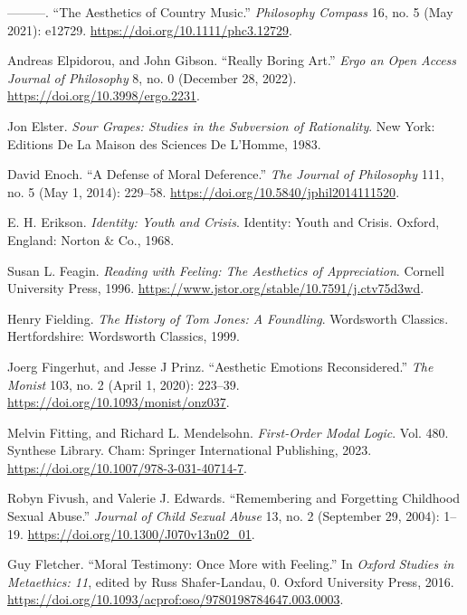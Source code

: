 \documentclass[phdthesis,12pt,final,a4paper]{wuthesis}
\newlength{\cslhangindent}
\newenvironment{CSLReferences}[2] %
{\begin{list}{}{%
	\setlength{\itemindent}{0pt}
	\setlength{\leftmargin}{0pt}
	\setlength{\parsep}{0pt}
	\ifodd #1
	\setlength{\leftmargin}{\cslhangindent}
	\setlength{\itemindent}{-1\cslhangindent}
	\fi
	\setlength{\itemsep}{#2\baselineskip}}}
{\end{list}}
\theoremstyle{definition}
\theoremstyle{definition}
\theoremstyle{definition}
\theoremstyle{definition}
\theoremstyle{remark}
\begin{document}
\begin{CSLReferences}{1}{0}
---------. {``The Aesthetics of Country Music.''} \emph{Philosophy Compass} 16, no. 5 (May 2021): e12729. \url{https://doi.org/10.1111/phc3.12729}.

Andreas Elpidorou, and John Gibson. {``Really {Boring Art}.''} \emph{Ergo an Open Access Journal of Philosophy} 8, no. 0 (December 28, 2022). \url{https://doi.org/10.3998/ergo.2231}.

Jon Elster. \emph{Sour {Grapes}: {Studies} in the {Subversion} of {Rationality}}. New York: Editions De La Maison des Sciences De L'Homme, 1983.

David Enoch. {``A {Defense} of {Moral Deference}.''} \emph{The Journal of Philosophy} 111, no. 5 (May 1, 2014): 229--58. \url{https://doi.org/10.5840/jphil2014111520}.

E. H. Erikson. \emph{Identity: Youth and Crisis}. Identity: Youth and Crisis. Oxford, England: Norton \& Co., 1968.

Susan L. Feagin. \emph{Reading with {Feeling}: {The Aesthetics} of {Appreciation}}. Cornell University Press, 1996. \url{https://www.jstor.org/stable/10.7591/j.ctv75d3wd}.

Henry Fielding. \emph{The {History} of {Tom Jones}: {A} Foundling}. Wordsworth {Classics}. Hertfordshire: Wordsworth Classics, 1999.

Joerg Fingerhut, and Jesse J Prinz. {``Aesthetic Emotions Reconsidered.''} \emph{The Monist} 103, no. 2 (April 1, 2020): 223--39. \url{https://doi.org/10.1093/monist/onz037}.

Melvin Fitting, and Richard L. Mendelsohn. \emph{First-{Order Modal Logic}}. Vol. 480. Synthese {Library}. Cham: Springer International Publishing, 2023. \url{https://doi.org/10.1007/978-3-031-40714-7}.

Robyn Fivush, and Valerie J. Edwards. {``Remembering and {Forgetting Childhood Sexual Abuse}.''} \emph{Journal of Child Sexual Abuse} 13, no. 2 (September 29, 2004): 1--19. \url{https://doi.org/10.1300/J070v13n02_01}.

Guy Fletcher. {``Moral {Testimony}: {Once More} with {Feeling}.''} In \emph{Oxford {Studies} in {Metaethics}: 11}, edited by Russ Shafer-Landau, 0. Oxford University Press, 2016. \url{https://doi.org/10.1093/acprof:oso/9780198784647.003.0003}.


\end{CSLReferences}
\end{document}
